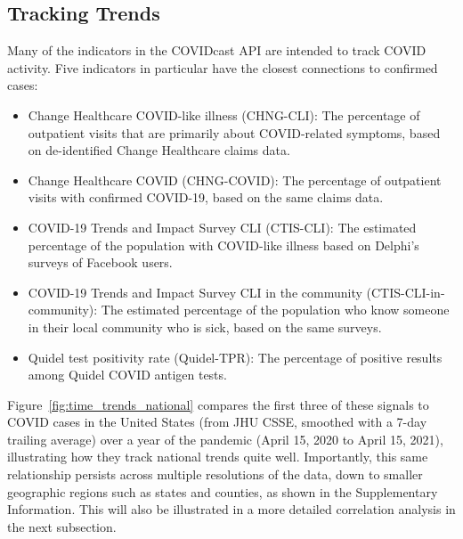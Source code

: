 \documentclass[9pt,twocolumn,twoside,lineno]{pnas-new}
\begin{document}
\subsection{Tracking Trends}

Many of the indicators in the COVIDcast API are intended to track COVID
activity. Five indicators in particular have the closest connections to
confirmed cases:

\begin{itemize}
\item Change Healthcare COVID-like illness (CHNG-CLI): The percentage of
  outpatient visits that are primarily about COVID-related symptoms, based on
  de-identified Change Healthcare claims data.
\item Change Healthcare COVID (CHNG-COVID): The percentage of outpatient visits
  with confirmed COVID-19, based on the same claims data.
\item COVID-19 Trends and Impact Survey CLI (CTIS-CLI): The estimated percentage
  of the population with COVID-like illness based on Delphi's surveys of
  Facebook users.
\item COVID-19 Trends and Impact Survey CLI in the community
  (CTIS-CLI-in-community): The estimated percentage of the population who know
  someone in their local community who is sick, based on the same surveys.
\item Quidel test positivity rate (Quidel-TPR): The percentage of positive
  results among Quidel COVID antigen tests.
\end{itemize}

Figure~\ref{fig:time_trends_national} compares the first three of these signals
to COVID cases in the United States (from JHU CSSE, smoothed with a 7-day
trailing average) over a year of the pandemic (April 15, 2020 to April 15,
2021), illustrating how they track national trends quite well. Importantly, this
same relationship persists across multiple resolutions of the data, down to
smaller geographic regions such as states and counties, as shown in the
Supplementary Information. This will also be illustrated in a more detailed
correlation analysis in the next subsection.
\end{document}
